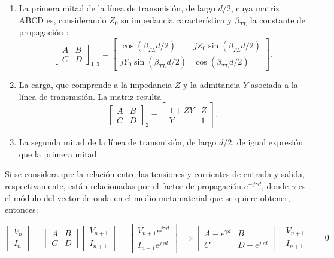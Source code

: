 \begin{enumerate}
	\item La primera mitad de la línea de transmisión, de largo $d/2$, cuya matriz ABCD es, considerando $Z_0$ su impedancia característica y $\beta_{TL}$ la constante de propagación \cite{Pozar:MwEngineering}:
	\begin{equation}
		\begin{bmatrix}
			A & B \\
			C & D
		\end{bmatrix}_{1,3}
		=
		\begin{bmatrix}
			\cos(\beta_{TL} d/2) & j Z_0 \sin(\beta_{TL} d/2) \\
			j Y_0 \sin(\beta_{TL} d/2) & \cos(\beta_{TL} d/2)
		\end{bmatrix}.
	\end{equation}
	\item La carga, que comprende a la impedancia $Z$ y la admitancia $Y$ asociada a la línea de transmisión. La matriz resulta
	\begin{equation}
		\begin{bmatrix}
			A & B \\
			C & D
		\end{bmatrix}_{2}
		=
		\begin{bmatrix}
			1+ZY & Z \\
			Y & 1
		\end{bmatrix}.
	\end{equation}
	\item La segunda mitad de la línea de transmisión, de largo $d/2$, de igual expresión que la primera mitad.
\end{enumerate}

Si se considera que la relación entre las tensiones y corrientes de entrada y salida, respectivamente, están relacionadas por el factor de propagación $e^{-j\gamma d}$, donde $\gamma$ es el módulo del vector de onda en el medio metamaterial que se quiere obtener, entonces:

\begin{equation}
	\begin{bmatrix}
		V_n \\ I_n
	\end{bmatrix}
	=
	\begin{bmatrix}
	A & B \\
	C & D
	\end{bmatrix}
	\begin{bmatrix}
	V_{n+1} \\
	I_{n+1}
	\end{bmatrix}
	=
	\begin{bmatrix}
	V_{n+1}e^{j\gamma d} \\ 
	I_{n+1}e^{j\gamma d}
	\end{bmatrix}
	\implies
	\begin{bmatrix}
	A-e^{\gamma d} & B \\
	C & D-e^{j\gamma d}
	\end{bmatrix}
	\begin{bmatrix}
	V_{n+1} \\ I_{n+1}
	\end{bmatrix}
	= 0
\end{equation}


